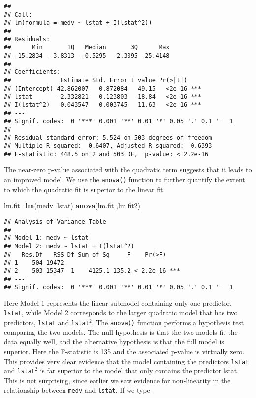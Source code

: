 \documentclass[]{article}
\newenvironment{Shaded}{\begin{snugshade}}{\end{snugshade}}
\newcommand{\KeywordTok}[1]{\textcolor[rgb]{0.13,0.29,0.53}{\textbf{#1}}}
\newcommand{\OperatorTok}[1]{\textcolor[rgb]{0.81,0.36,0.00}{\textbf{#1}}}
\newcommand{\NormalTok}[1]{#1}
\begin{document}
\begin{verbatim}
## 
## Call:
## lm(formula = medv ~ lstat + I(lstat^2))
## 
## Residuals:
##      Min       1Q   Median       3Q      Max 
## -15.2834  -3.8313  -0.5295   2.3095  25.4148 
## 
## Coefficients:
##              Estimate Std. Error t value Pr(>|t|)    
## (Intercept) 42.862007   0.872084   49.15   <2e-16 ***
## lstat       -2.332821   0.123803  -18.84   <2e-16 ***
## I(lstat^2)   0.043547   0.003745   11.63   <2e-16 ***
## ---
## Signif. codes:  0 '***' 0.001 '**' 0.01 '*' 0.05 '.' 0.1 ' ' 1
## 
## Residual standard error: 5.524 on 503 degrees of freedom
## Multiple R-squared:  0.6407, Adjusted R-squared:  0.6393 
## F-statistic: 448.5 on 2 and 503 DF,  p-value: < 2.2e-16
\end{verbatim}

The near-zero p-value associated with the quadratic term suggests that
it leads to an improved model. We use the \texttt{anova()} function to
further quantify the extent to which the quadratic fit is superior to
the linear fit.

\begin{Shaded}
\begin{Highlighting}[]
\NormalTok{lm.fit=}\KeywordTok{lm}\NormalTok{(medv}\OperatorTok{~}\NormalTok{lstat) }
\KeywordTok{anova}\NormalTok{(lm.fit ,lm.fit2)}
\end{Highlighting}
\end{Shaded}

\begin{verbatim}
## Analysis of Variance Table
## 
## Model 1: medv ~ lstat
## Model 2: medv ~ lstat + I(lstat^2)
##   Res.Df   RSS Df Sum of Sq     F    Pr(>F)    
## 1    504 19472                                 
## 2    503 15347  1    4125.1 135.2 < 2.2e-16 ***
## ---
## Signif. codes:  0 '***' 0.001 '**' 0.01 '*' 0.05 '.' 0.1 ' ' 1
\end{verbatim}

Here Model 1 represents the linear submodel containing only one
predictor, \texttt{lstat}, while Model 2 corresponds to the larger
quadratic model that has two predictors, \texttt{lstat} and
\texttt{lstat}\(^2\). The \texttt{anova()} function performs a
hypothesis test comparing the two models. The null hypothesis is that
the two models fit the data equally well, and the alternative hypothesis
is that the full model is superior. Here the F-statistic is 135 and the
associated p-value is virtually zero. This provides very clear evidence
that the model containing the predictors \texttt{lstat} and
\texttt{lstat}\(^2\) is far superior to the model that only contains the
predictor lstat. This is not surprising, since earlier we saw evidence
for non-linearity in the relationship between \texttt{medv} and
\texttt{lstat}. If we type
\end{document}
